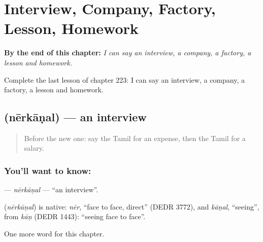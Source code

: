 
\chapter{Interview, Company, Factory, Lesson, Homework}
\label{ch:ta-interview-company-factory-lesson-homework}

\begin{chapteropening}
\textbf{By the end of this chapter:} \emph{I can say an interview, a company, a factory, a lesson and homework.}

Complete the last lesson of chapter 223: I can say an interview, a company, a factory, a lesson and homework.
\end{chapteropening}

\section[\texorpdfstring{\ta{நேர்காணல்} (nērkāṇal)}{நேர்காணல் (nērkāṇal)}]{ (nērkāṇal) — an interview}

\label{lesson:TA-C223-nerkanal}



\begin{quote}
Before the new one: say the Tamil for an expense, then the Tamil for a salary.
\end{quote}

\subsection*{You'll want to know: }
\textbf{} — \emph{nērkāṇal} — \textquotedblleft{}an interview\textquotedblright{}.

\begin{cousinweb}
\textbf{} (\emph{nērkāṇal}) is native: \emph{nēr}, \textquotedblleft{}face to face, direct\textquotedblright{} (DEDR 3772), and \emph{kāṇal}, \textquotedblleft{}seeing\textquotedblright{}, from \emph{kāṇ} (DEDR 1443): \textquotedblleft{}seeing face to face\textquotedblright{}.
\end{cousinweb}

\begin{grammarlens}[title={What you've built}]
One more word for this chapter.
\end{grammarlens}

